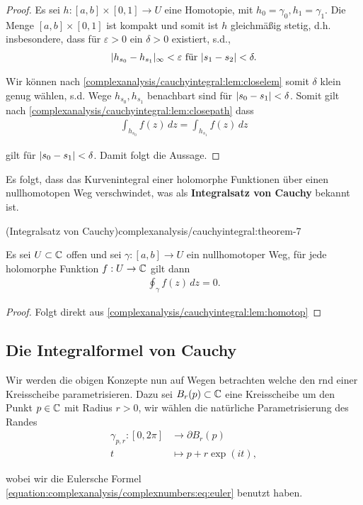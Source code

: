 \begin{proof}
 Es sei \(h:[a,b]\times[0,1]\to U\) eine Homotopie, mit \(h_0=\gamma_0, h_1=\gamma_1\). Die Menge \([a,b]\times[0,1]\) ist kompakt und somit ist \(h\) gleichmäßig stetig, d.h. insbesondere, dass für \(\varepsilon>0\) ein \(\delta >0\) existiert, s.d.,
\begin{align*}
\vert h_{s_0}-h_{s_1} \vert_\infty <\varepsilon \text{ für } \vert s_1-s_2 \vert< \delta.
\end{align*}
\par
Wir können nach \cref{complexanalysis/cauchyintegral:lem:closelem} somit \(\delta\) klein genug wählen, s.d. Wege \(h_{s_0}, h_{s_1}\) benachbart sind für \(\vert s_0-s_1 \vert<\delta\). Somit gilt nach \cref{complexanalysis/cauchyintegral:lem:closepath}  dass
\begin{align*}
\int_{h_{s_0}} f(z)\, dz = \int_{h_{s_1}} f(z)\, dz
\end{align*}
\par
gilt für \(\vert s_0-s_1 \vert<\delta\). Damit folgt die Aussage.
\end{proof}

\par
Es folgt, dass das Kurvenintegral einer holomorphe Funktionen über einen nullhomotopen Weg verschwindet, was als \textbf{Integralsatz von Cauchy} bekannt ist.
\begin{theorem}{(Integralsatz von Cauchy)}{complexanalysis/cauchyintegral:theorem-7}



\par
Es sei \(U\subset\mathbb{C}\) offen und sei \(\gamma:[a,b]\to U\) ein nullhomotoper Weg, für jede holomorphe Funktion \(f:U\to\mathbb{C}\) gilt dann
\begin{align*}
\oint_\gamma f(z)\, dz = 0.
\end{align*}\end{theorem}

\begin{proof}
 Folgt direkt aus \cref{complexanalysis/cauchyintegral:lem:homotop} 
\end{proof}


\subsection{Die Integralformel von Cauchy}
\label{\detokenize{complexanalysis/cauchyintegral:die-integralformel-von-cauchy}}
\par
Wir werden die obigen Konzepte nun auf Wegen betrachten welche den rnd einer Kreisscheibe parametrisieren. Dazu sei \(B_r(p)\subset\mathbb{C}\) eine Kreisscheibe um den Punkt \(p\in\mathbb{C}\) mit Radius \(r>0\), wir wählen die natürliche Parametrisierung des Randes
\begin{align*}
\gamma_{p,r}:[0,2\pi]&\to \partial B_r(p)\\
t&\mapsto p + r\exp(i t),
\end{align*}
\par
wobei wir die Eulersche Formel \eqref{equation:complexanalysis/complexnumbers:eq:euler} benutzt haben.

